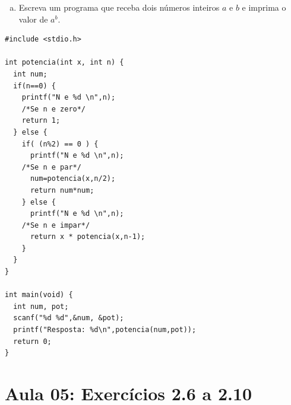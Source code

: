 \documentclass[a4paper,10pt]{article}
\begin{document}
\begin{enumerate}
\begin{enumerate}[(a)]
\pagebreak

\item Escreva um programa que receba dois números inteiros $a$ e $b$ e imprima o valor de $a^b$.
  \end{enumerate}
  
\begin{lstlisting}
#include <stdio.h>

int potencia(int x, int n) {
  int num;
  if(n==0) {
    printf("N e %d \n",n);
    /*Se n e zero*/
    return 1;
  } else {
    if( (n%2) == 0 ) {
      printf("N e %d \n",n);
    /*Se n e par*/
      num=potencia(x,n/2);
      return num*num;
    } else {
      printf("N e %d \n",n);
    /*Se n e impar*/
      return x * potencia(x,n-1);
    }
  }
}

int main(void) {
  int num, pot;
  scanf("%d %d",&num, &pot);
  printf("Resposta: %d\n",potencia(num,pot));
  return 0;
}
\end{lstlisting}

\end{enumerate} %
\pagebreak



\newpage
\section{Aula 05: Exercícios 2.6 a 2.10}
\end{document}
